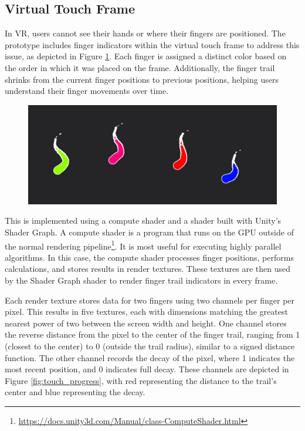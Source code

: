     \subsection{Virtual Touch Frame} \label{sec:touch_frame}

        In VR, users cannot see their hands or where their fingers are positioned. The prototype includes finger indicators within the virtual touch frame to address this issue, as depicted in Figure \ref{fig:touch_indicators}. Each finger is assigned a distinct color based on the order in which it was placed on the frame. Additionally, the finger trail shrinks from the current finger positions to previous positions, helping users understand their finger movements over time.
      
        \begin{figure}[h!]
            \centering
            \includegraphics[width=1\textwidth]{figures/touch_indicators.png}
            \label{fig:touch_indicators}
        \end{figure}

        This is implemented using a compute shader and a shader built with Unity's Shader Graph. A compute shader is a program that runs on the GPU outside of the normal rendering pipeline\footnote{\url{https://docs.unity3d.com/Manual/class-ComputeShader.html}}. It is most useful for executing highly parallel algorithms. In this case, the compute shader processes finger positions, performs calculations, and stores results in render textures. These textures are then used by the Shader Graph shader to render finger trail indicators in every frame.

        Each render texture stores data for two fingers using two channels per finger per pixel. This results in five textures, each with dimensions matching the greatest nearest power of two between the screen width and height. One channel stores the reverse distance from the pixel to the center of the finger trail, ranging from 1 (closest to the center) to 0 (outside the trail radius), similar to a signed distance function. The other channel records the decay of the pixel, where 1 indicates the most recent position, and 0 indicates full decay. These channels are depicted in Figure \ref{fig:touch_progress}, with red representing the distance to the trail's center and blue representing the decay.
        
